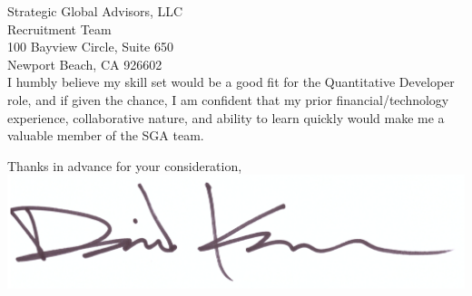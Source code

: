 \documentclass{letter}
\begin{document}
\begin{letter}{
  Strategic Global Advisors, LLC \\
  Recruitment Team \\
  100 Bayview Circle, Suite 650 \\
  Newport Beach, CA 926602 \\
}
I humbly believe my skill set would be a good fit for the Quantitative Developer
role, and if given the chance, I am confident that my prior financial/technology
experience, collaborative nature, and ability to learn quickly would make me a
valuable member of the SGA team.

\closing{
  Thanks in advance for your consideration, \\
  \vspace{.33in}
  \includegraphics[scale=0.33]{signature.png}
}

\end{letter}
\end{document}
